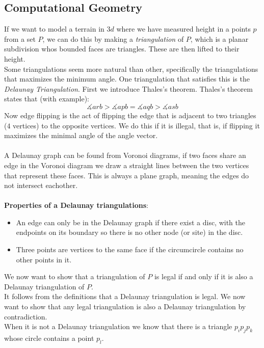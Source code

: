 \documentclass[a4paper]{article}
\author{Nikolaj Dybdahl Rathcke (rfq695)}
\begin{document}
\begin{center}
\section*{Computational Geometry}
\end{center}
If we want to model a terrain in $3d$ where we have measured height in a points $p$ from a set $P$, we can do this by making a \textit{triangulation} of $P$, which is a planar subdivision whos bounded faces are triangles. These are then lifted to their height. \\
Some triangulations seem more natural than other, specifically the triangulations that maximizes the minimum angle. One triangulation that satisfies this is the \textit{Delaunay Triangulation}.
First we introduce Thales's theorem. Thales's theorem states that (with example):
$$\measuredangle arb > \measuredangle apb=\measuredangle aqb > \measuredangle asb$$
Now edge flipping is the act of flipping the edge that is adjacent to two triangles ($4$ vertices) to the opposite vertices. We do this if it is illegal, that is, if flipping it maximizes the minimal angle of the angle vector. \\
\\
A Delaunay graph can be found from Voronoi diagrams, if two faces share an edge in the Voronoi diagram we draw a straight lines between the two vertices that represent these faces. This is always a plane graph, meaning the edges do not intersect eachother. \\
\\
\textbf{Properties of a Delaunay triangulations}:
\begin{itemize}
  \item An edge can only be in the Delaunay graph if there exist a disc, with the endpoints on its boundary so there is no other node (or site) in the disc.
  \item Three points are vertices to the same face if the circumcircle contains no other points in it.
\end{itemize}
We now want to show that a triangulation of $P$ is legal if and only if it is also a Delaunay triangulation of $P$. \\
It follows from the definitions that a Delaunay triangulation is legal. We now want to show that any legal triangulation is also a Delaunay triangulation by contradiction. \\
When it is not a Delaunay triangulation we know that there is a triangle $p_ip_jp_k$ whose circle contains a point $p_l$.
\end{document}
